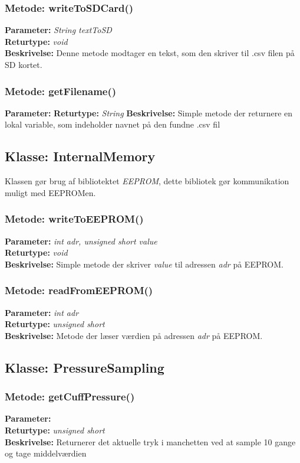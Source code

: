 \subsubsection{Metode: writeToSDCard()}
\textbf{Parameter: } \textit{String textToSD}
\\ \textbf{Returtype: } \textit{void}
\\ \textbf{Beskrivelse: }  Denne metode modtager en tekst, som den skriver til .csv filen på SD kortet.

\subsubsection{Metode: getFilename()}
\textbf{Parameter: }\textit{}
\textbf{Returtype: } \textit{String}
\textbf{Beskrivelse: } Simple metode der returnere en lokal variable, som indeholder navnet på den fundne .csv fil

\subsection{Klasse: InternalMemory}
Klassen gør brug af bibliotektet \textit{EEPROM}, dette bibliotek gør kommunikation muligt med EEPROMen. 

\subsubsection{Metode: writeToEEPROM()}
\textbf{Parameter: } \textit{int adr, unsigned short value}
\\ \textbf{Returtype: } \textit{void}
\\ \textbf{Beskrivelse: }  Simple metode der skriver \textit{value} til adressen \textit{adr} på EEPROM.

\subsubsection{Metode: readFromEEPROM()}
\textbf{Parameter: } \textit{int adr}
\\ \textbf{Returtype: } \textit{unsigned short}
\\ \textbf{Beskrivelse: }  Metode der læser værdien på adressen \textit{adr} på EEPROM. 

\subsection{Klasse: PressureSampling}

\subsubsection{Metode: getCuffPressure()}
\textbf{Parameter: } 
\\ \textbf{Returtype: } \textit{unsigned short }
\\ \textbf{Beskrivelse: } Returnerer det aktuelle tryk i manchetten ved at sample 10 gange og tage middelværdien


